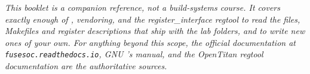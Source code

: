 \cleardoublepage
\thispagestyle{empty}
\vspace*{\fill}
\begin{center}
\begin{minipage}{0.78\textwidth}
\small\itshape
This booklet is a companion reference, not a build-systems course. It covers
exactly enough of \FuseSoC, vendoring,  and the register\_interface
regtool to read the  files, Makefiles and  register
descriptions that ship with the lab folders, and to write new ones of your
own. For anything beyond this scope, the official \FuseSoC documentation at
\texttt{fusesoc.readthedocs.io}, GNU 's manual, and the OpenTitan
regtool documentation are the authoritative sources.
\end{minipage}
\end{center}
\vspace*{\fill}
\cleardoublepage
